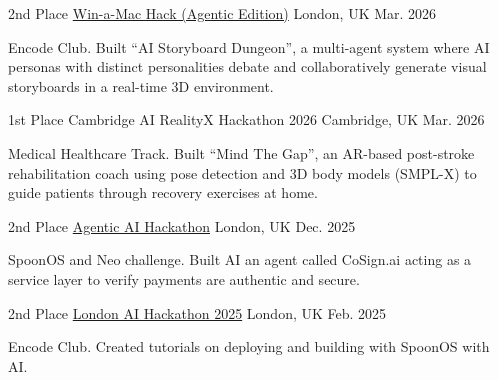 



\begin{cventries}

    \cventry
        {2nd Place} %
        {\href{https://www.encodeclub.com/}{Win-a-Mac Hack (Agentic Edition)}} %
        {London, UK} %
        {Mar. 2026} %
        {
        \begin{cvitems} %
            \item {Encode Club. Built ``AI Storyboard Dungeon'', a multi-agent system where AI personas with distinct personalities debate and collaboratively generate visual storyboards in a real-time 3D environment.}
        \end{cvitems}
        }

    \cventry
        {1st Place} %
        {Cambridge AI RealityX Hackathon 2026} %
        {Cambridge, UK} %
        {Mar. 2026} %
        {
        \begin{cvitems} %
            \item {Medical Healthcare Track. Built ``Mind The Gap'', an AR-based post-stroke rehabilitation coach using pose detection and 3D body models (SMPL-X) to guide patients through recovery exercises at home.}
        \end{cvitems}
        }

    \cventry
        {2nd Place} %
        {\href{https://www.encodeclub.com/}{Agentic AI Hackathon}} %
        {London, UK} %
        {Dec. 2025} %
        {
        \begin{cvitems} %
            \item {SpoonOS and Neo challenge. Built AI an agent called CoSign.ai acting as a service layer to verify payments are authentic and secure.}
        \end{cvitems}
        }

    \cventry
        {2nd Place} %
        {\href{https://www.encodeclub.com/}{London AI Hackathon 2025}} %
        {London, UK} %
        {Feb. 2025} %
        {
        \begin{cvitems} %
            \item {Encode Club. Created tutorials on deploying and building with SpoonOS with AI.}
        \end{cvitems}
        }


\end{cventries}
